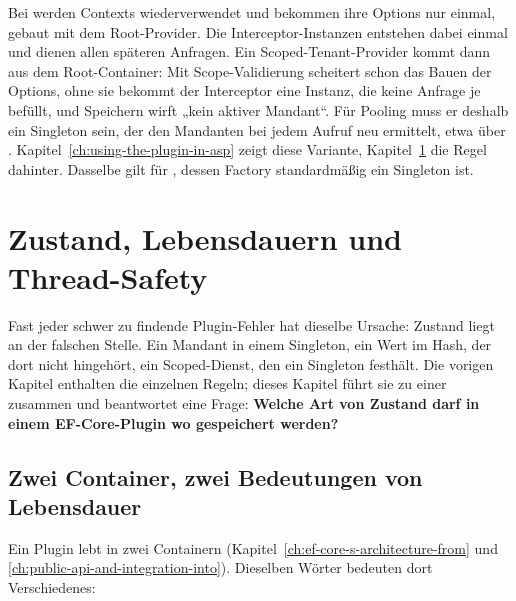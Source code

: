 \begin{important}
  Bei  werden Contexts
  wiederverwendet und bekommen ihre Options nur einmal, gebaut mit dem Root-Provider. Die
  Interceptor-Instanzen entstehen dabei einmal und dienen allen späteren Anfragen. Ein
  Scoped-Tenant-Provider kommt dann aus dem Root-Container: Mit Scope-Validierung scheitert
  schon das Bauen der Options, ohne sie bekommt der Interceptor eine Instanz, die keine Anfrage
  je befüllt, und Speichern wirft „kein aktiver Mandant“. Für Pooling muss er deshalb ein Singleton sein, der den Mandanten bei jedem
  Aufruf neu ermittelt, etwa über .
  Kapitel~\ref{ch:using-the-plugin-in-asp} zeigt diese Variante,
  Kapitel~\ref{ch:state-lifetimes-and-thread-safety} die Regel dahinter. Dasselbe gilt für
  , dessen Factory
  standardmäßig ein Singleton ist.
\end{important}

\chapter{Zustand, Lebensdauern und Thread-Safety}\label{ch:state-lifetimes-and-thread-safety}

Fast jeder schwer zu findende Plugin-Fehler hat dieselbe Ursache: Zustand liegt an der
falschen Stelle. Ein Mandant in einem Singleton, ein Wert im Hash, der dort nicht hingehört,
ein Scoped-Dienst, den ein Singleton festhält. Die vorigen Kapitel enthalten die einzelnen
Regeln; dieses Kapitel führt sie zu einer zusammen und beantwortet eine Frage:
\textbf{Welche Art von Zustand darf in einem EF-Core-Plugin wo gespeichert werden?}

\section{Zwei Container, zwei Bedeutungen von Lebensdauer}

Ein Plugin lebt in zwei Containern (Kapitel~\ref{ch:ef-core-s-architecture-from} und
\ref{ch:public-api-and-integration-into}). Dieselben Wörter bedeuten dort Verschiedenes:

